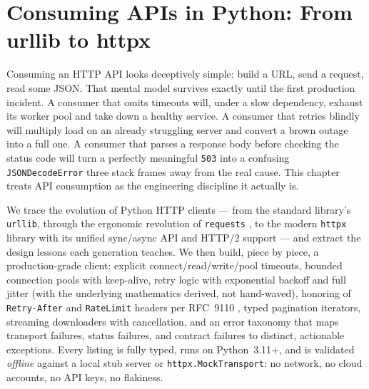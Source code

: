 
\chapter{Consuming APIs in Python: From urllib to httpx}
\label{ch:consuming_python}


Consuming an HTTP API looks deceptively simple: build a URL, send a request,
read some JSON. That mental model survives exactly until the first production
incident. A consumer that omits timeouts will, under a slow dependency, exhaust
its worker pool and take down a healthy service. A consumer that retries
blindly will multiply load on an already struggling server and convert a brown
outage into a full one. A consumer that parses a response body before checking
the status code will turn a perfectly meaningful \texttt{503} into a confusing
\texttt{JSONDecodeError} three stack frames away from the real cause. This
chapter treats API consumption as the engineering discipline it actually is.

We trace the evolution of Python HTTP clients --- from the standard library's
\texttt{urllib}, through the ergonomic revolution of \texttt{requests}
\cite{requestsdocs}, to the modern \texttt{httpx} library with its unified
sync/async API and HTTP/2 support \cite{httpxdocs} --- and extract the design
lessons each generation teaches. We then build, piece by piece, a
production-grade client: explicit connect/read/write/pool timeouts, bounded
connection pools with keep-alive, retry logic with exponential backoff and full
jitter (with the underlying mathematics derived, not hand-waved), honoring of
\texttt{Retry-After} and \texttt{RateLimit} headers per RFC~9110
\cite{rfc9110}, typed pagination iterators, streaming downloaders with
cancellation, and an error taxonomy that maps transport failures, status
failures, and contract failures to distinct, actionable exceptions. Every
listing is fully typed, runs on Python~3.11+, and is validated \emph{offline}
against a local stub server or \texttt{httpx.MockTransport}: no network, no
cloud accounts, no API keys, no flakiness.

